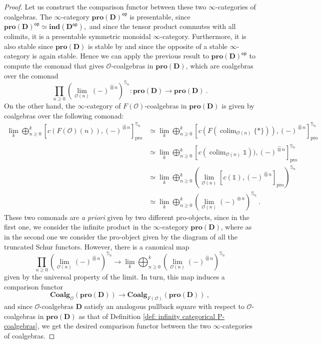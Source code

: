 \documentclass{proc-l}
\DeclareMathOperator*{\colim}{colim}
\theoremstyle{plain}
\theoremstyle{definition}
\theoremstyle{remark}
\begin{document}
\begin{proof}
Let us construct the comparison functor between these two $\infty$-categories of coalgebras. The $\infty$-category $\mathbf{pro}(\mathbf{D})^{\mathsf{op}}$ is presentable, since
$
\mathbf{pro}(\mathbf{D})^{\mathsf{op}} \simeq \mathbf{ind}(\mathbf{D}^{\mathsf{op}}),
$ and since the tensor product commutes with all colimits, it is a presentable symmetric monoidal $\infty$-category. Furthermore, it is also stable since $\mathbf{pro}(\mathbf{D})$ is stable by \cite[Lemma 2.5]{Ktheorynonarch} and since the opposite of a stable $\infty$-category is again stable. Hence we can apply the previous result to $\mathbf{pro}(\mathbf{D})^{\mathsf{op}}$ to compute the comonad that gives $\mathscr{O}$-coalgebras in $\mathbf{pro}(\mathbf{D})$, which are coalgebras over the comonad
\[
\prod_{n \geq 0} \left(\lim_{\mathscr{O}(n)} (-)^{\widehat{\otimes} n} \right)^{\mathbb{S}_n}: \mathbf{pro}(\mathbf{D}) \longrightarrow \mathbf{pro}(\mathbf{D})~.
\]
On the other hand, the $\infty$-category of $F(\mathscr{O})$-coalgebras in $\mathbf{pro}(\mathbf{D})$ is given by coalgebras over the following comonad:
\begin{align*}
\lim_k \bigoplus_{n \geq 0}^{k} \left[c(F(\mathscr{O})(n)),(-)^{\widehat{\otimes} n} \right]^{\mathbb{S}_n}_{\mathrm{pro}}  &\simeq \lim_k \bigoplus_{n \geq 0}^{k} \left[c(F(\colim_{\mathscr{O}(n)} \{*\})),(-)^{\widehat{\otimes} n} \right]^{\mathbb{S}_n}_{\mathrm{pro}} \\
&\simeq  \lim_k \bigoplus_{n \geq 0}^{k} \left[c(\colim_{\mathscr{O}(n)} \mathbb{1})),(-)^{\widehat{\otimes} n} \right]^{\mathbb{S}_n}_{\mathrm{pro}}\\
&\simeq \lim_k \bigoplus_{n \geq 0}^{k} \left(\lim_{\mathscr{O}(n)} \left[c(\mathbb{1}),(-)^{\widehat{\otimes} n} \right]_{\mathrm{pro}}\right)^{\mathbb{S}_n} \\
&\simeq \lim_k \bigoplus_{n \geq 0}^{k} \left(\lim_{\mathscr{O}(n)} (-)^{\widehat{\otimes} n}\right)^{\mathbb{S}_n}~.
\end{align*}
These two comonads are \textit{a priori} given by two different pro-objects, since in the first one, we consider the infinite product in the $\infty$-category $\mathbf{pro}(\mathbf{D})$, where as in the second one we consider the pro-object given by the diagram of all the truncated Schur functors. However, there is a canonical map
\[
\prod_{n \geq 0} \left(\lim_{\mathscr{O}(n)} (-)^{\widehat{\otimes} n} \right)^{\mathbb{S}_n} \longrightarrow \lim_k\bigoplus_{n \geq 0}^{k}  \left(\lim_{\mathscr{O}(n)} (-)^{\widehat{\otimes} n}\right)^{\mathbb{S}_n}
\]
given by the universal property of the limit. In turn, this map induces a comparison functor
\[
\mathbf{Coalg}_{\mathscr{O}}(\mathbf{pro}(\mathbf{D})) \longrightarrow \mathbf{Coalg}_{F(\mathscr{O})}(\mathbf{pro}(\mathbf{D}))~,
\]
and since $\mathscr{O}$-coalgebras $\mathbf{D}$ satisfy an analogous pullback square with respect to $\mathscr{O}$-coalgebras in $\mathbf{pro}(\mathbf{D})$ as that of Definition \ref{def: infinity categorical P-coalgebras}, we get the desired comparison functor between the two $\infty$-categories of coalgebras.


\end{proof}
\end{document}
